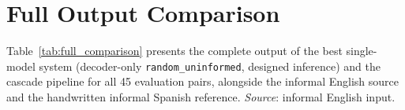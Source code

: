 \documentclass[11pt]{article}
\begin{document}


\clearpage
\onecolumn
\appendix

\section{Full Output Comparison}
\label{sec:appendix_full}

Table~\ref{tab:full_comparison} presents the complete output of the best
single-model system (decoder-only \texttt{random\_uninformed}, designed
inference) and the cascade pipeline for all 45 evaluation pairs, alongside the
informal English source and the handwritten informal Spanish reference. \emph{Source}: informal English input.
\end{document}
